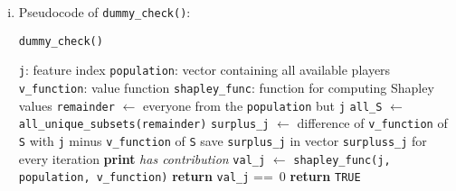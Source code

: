 {\begin{enumerate}[a)]
\begin{enumerate}[(i)]
	\begin{algorithm}[H]
		\caption{\texttt{symmetry\_check()}}
		\begin{algorithmic}[1]
			\Require \texttt{j}: first feature index
			\Require \texttt{k}: second feature index
			\Require \texttt{population}: vector containing all available players
			\Require \texttt{v\_function}: value function
			\Require \texttt{shapley\_func}: function for computing Shapley values
			\State \texttt{remainder} $\gets$ everyone from the \texttt{population} but \texttt{j, k}
			\State \texttt{all\_S} $\gets$ \texttt{all\_unique\_subsets(remainder)}
			\State \texttt{surplus\_j} $\gets$ \texttt{v\_function(Union(coalition, j)) - v\_function(coalition)}
			\State \texttt{surplus\_k} $\gets$ \texttt{v\_function(Union(coalition, k)) - v\_function(coalition)}
			\State save \texttt{surplus\_j} and \texttt{surplus\_k} in vectors \texttt{surpluss\_j} and \texttt{surpluss\_k}, respectively, for every iteration
			\EndFor
			\State \textbf{print} \textit{equal surplus}
			\State \texttt{val\_j} $\gets$ \texttt{shapley\_func(j, population, v\_function)}
			\State \texttt{val\_k} $\gets$ \texttt{shapley\_func(k, population, v\_function)}
			\State \textbf{return} \texttt{val\_j} == \texttt{val\_k}
			\EndIf
			\State \textbf{return} \texttt{TRUE}
		\end{algorithmic}
	\end{algorithm}
	
	\item Pseudocode of \texttt{dummy\_check()}:
	
	\begin{algorithm}[H]
		\caption{\texttt{dummy\_check()}}
		\begin{algorithmic}[1]
			\Require \texttt{j}: feature index
			\Require \texttt{population}: vector containing all available players
			\Require \texttt{v\_function}: value function
			\Require \texttt{shapley\_func}: function for computing Shapley values
			\State \texttt{remainder} $\gets$ everyone from the \texttt{population} but \texttt{j}
			\State \texttt{all\_S} $\gets$ \texttt{all\_unique\_subsets(remainder)}
			\State \texttt{surplus\_j} $\gets$ difference of \texttt{v\_function} of \texttt{S} with \texttt{j} minus \texttt{v\_function} of \texttt{S}
			\State save \texttt{surplus\_j} in vector \texttt{surpluss\_j} for every iteration
			\EndFor
			\State \textbf{print} \textit{has contribution}
			\State \texttt{val\_j} $\gets$ \texttt{shapley\_func(j, population, v\_function)}
			\State \textbf{return} \texttt{val\_j} ==\, 0
			\EndIf
			\State \textbf{return} \texttt{TRUE}
		\end{algorithmic}
	\end{algorithm}


\end{enumerate}
\end{enumerate}}
